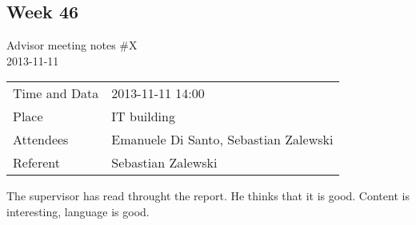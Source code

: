 \clearpage
\subsection{Week 46}
\begin{center}
Advisor meeting notes \#X \\
2013-11-11 \\
\end{center}

\begin{table}[H]
\begin{center}
\begin{tabular}{ l | l }
Time and Data & 2013-11-11 14:00 \\
Place & IT building \\
Attendees & Emanuele Di Santo, Sebastian Zalewski \\
Referent & Sebastian Zalewski \\
\end{tabular}
\end{center}
\end{table}

The supervisor has read throught the report.
He thinks that it is good. Content is interesting, language is good.

